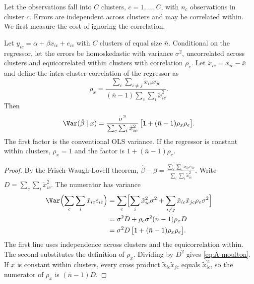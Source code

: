 Let the observations fall into $C$ clusters, $c = 1, \dots, C$, with $n_c$ observations in cluster $c$. Errors are
independent across clusters and may be correlated within. We first measure the cost of ignoring the correlation.

\begin{proposition}\label{prop:A-moulton}
Let $y_{ic} = \alpha + \beta x_{ic} + e_{ic}$ with $C$ clusters of equal size $\bar n$. Conditional on the
regressor, let the errors be homoskedastic with variance $\sigma^2$, uncorrelated across clusters and equicorrelated
within clusters with correlation $\rho_e$. Let $\tilde x_{ic} = x_{ic} - \bar x$ and define the intra-cluster
correlation of the regressor as
\begin{equation*}
  \rho_x = \frac{\sum_{c}\sum_{i \ne j}\tilde x_{ic}\tilde x_{jc}}{(\bar n - 1)\sum_c\sum_i\tilde x_{ic}^2}.
\end{equation*}
Then
\begin{equation}\label{eq:A-moulton}
  \Var(\hat\beta \mid x) = \frac{\sigma^2}{\sum_c\sum_i\tilde x_{ic}^2}\,\bigl[1 + (\bar n - 1)\rho_x\rho_e\bigr].
\end{equation}
The first factor is the conventional OLS variance. If the regressor is constant within clusters, $\rho_x = 1$ and the
factor is $1 + (\bar n - 1)\rho_e$.
\end{proposition}

\begin{proof}
By the Frisch-Waugh-Lovell theorem, $\hat\beta - \beta = \frac{\sum_c\sum_i\tilde x_{ic}e_{ic}}{\sum_c\sum_i\tilde
x_{ic}^2}$. Write $D = \sum_c\sum_i\tilde x_{ic}^2$. The numerator has variance
\begin{align*}
  \Var\Bigl(\sum_c\sum_i\tilde x_{ic}e_{ic}\Bigr)
  &= \sum_c\Bigl[\sum_i\tilde x_{ic}^2\sigma^2 + \sum_{i \ne j}\tilde x_{ic}\tilde x_{jc}\rho_e\sigma^2\Bigr] \\
  &= \sigma^2D + \rho_e\sigma^2(\bar n - 1)\rho_xD \\
  &= \sigma^2D\,\bigl[1 + (\bar n - 1)\rho_x\rho_e\bigr].
\end{align*}
The first line uses independence across clusters and the equicorrelation within. The second substitutes the
definition of $\rho_x$. Dividing by $D^2$ gives \eqref{eq:A-moulton}. If $x$ is constant within clusters, every
cross product $\tilde x_{ic}\tilde x_{jc}$ equals $\tilde x_{ic}^2$, so the numerator of $\rho_x$ is $(\bar n - 1)D$.
\end{proof}

